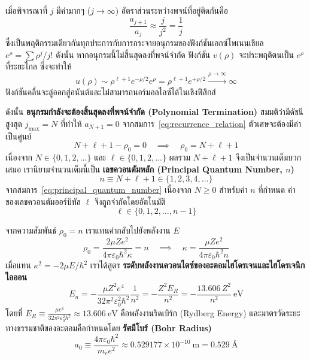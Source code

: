เมื่อพิจารณาที่ $j$ มีค่ามากๆ ($j \to \infty$) อัตราส่วนระหว่างพจน์ที่อยู่ติดกันคือ
\begin{equation}
\frac{a_{j+1}}{a_j} \approx \frac{j}{j^2} = \frac{1}{j}
\end{equation}
ซึ่งเป็นพฤติกรรมเดียวกันทุกประการกับการกระจายอนุกรมของฟังก์ชันเอกซ์โพเนนเชียล $e^\rho = \sum \rho^j/j!$ ดังนั้น หากอนุกรมนี้ไม่สิ้นสุดลงที่พจน์จำกัด ฟังก์ชัน $v(\rho)$ จะประพฤติตนเป็น $e^\rho$ ที่ระยะไกล ซึ่งจะทำให้
\begin{equation}
u(\rho) \sim \rho^{\ell+1} e^{-\rho/2} e^\rho = \rho^{\ell+1} e^{+\rho/2} \xrightarrow{\rho \to \infty} \infty
\end{equation}
ฟังก์ชันคลื่นจะลู่ออกสู่อนันต์และไม่สามารถนอร์มอลไลซ์ได้ในเชิงฟิสิกส์

ดังนั้น \textbf{อนุกรมกำลังจะต้องสิ้นสุดลงที่พจน์จำกัด (Polynomial Termination)} สมมติว่ามีดัชนีสูงสุด $j_{\text{max}} = N$ ที่ทำให้ $a_{N+1} = 0$ จากสมการ~\eqref{eq:recurrence_relation} ตัวเศษจะต้องมีค่าเป็นศูนย์
\begin{equation}
N + \ell + 1 - \rho_0 = 0 \quad \implies \quad \rho_0 = N + \ell + 1
\end{equation}
เนื่องจาก $N \in \{0, 1, 2, \dots\}$ และ $\ell \in \{0, 1, 2, \dots\}$ ผลรวม $N + \ell + 1$ จึงเป็นจำนวนเต็มบวกเสมอ เรานิยามจำนวนเต็มนี้เป็น \textbf{เลขควอนตัมหลัก (Principal Quantum Number, $n$)}
\begin{equation}
n \equiv N + \ell + 1 \in \{ 1, 2, 3, 4, \dots \}
\label{eq:principal_quantum_number}
\end{equation}
จากสมการ~\eqref{eq:principal_quantum_number} เนื่องจาก $N \ge 0$ สำหรับค่า $n$ ที่กำหนด ค่าของเลขควอนตัมออร์บิทัล $\ell$ จึงถูกจำกัดโดยอัตโนมัติ
\begin{equation}
\ell \in \{ 0, 1, 2, \dots, n - 1 \}
\end{equation}

จากความสัมพันธ์ $\rho_0 = n$ เราแทนค่ากลับไปยังพลังงาน $E$
\begin{equation}
\rho_0 = \frac{2\mu Z e^2}{4\pi\varepsilon_0 \hbar^2 \kappa} = n \quad \implies \quad \kappa = \frac{\mu Z e^2}{4\pi\varepsilon_0 \hbar^2 n}
\end{equation}
เมื่อแทน $\kappa^2 = -2\mu E/\hbar^2$ เราได้สูตร \textbf{ระดับพลังงานควอนไตซ์ของอะตอมไฮโดรเจนและไฮโดรเจนิกไอออน}
\begin{equation}
E_n = -\frac{\mu Z^2 e^4}{32\pi^2 \varepsilon_0^2 \hbar^2} \frac{1}{n^2} = -\frac{Z^2 E_R}{n^2} = -\frac{13.606 \, Z^2}{n^2}~\text{eV}
\label{eq:hydrogen_energy_formula}
\end{equation}
โดยที่ $E_R \equiv \frac{\mu e^4}{32\pi^2\varepsilon_0^2\hbar^2} \approx 13.606~\text{eV}$ คือพลังงานริดเบิร์ก (Rydberg Energy) และมาตรวัดระยะทางธรรมชาติของอะตอมคือกำหนดโดย \textbf{รัศมีโบร์ (Bohr Radius)}
\begin{equation}
a_0 \equiv \frac{4\pi\varepsilon_0 \hbar^2}{m_e e^2} \approx 0.529177 \times 10^{-10}~\text{m} = 0.529~\text{\AA}
\end{equation}

